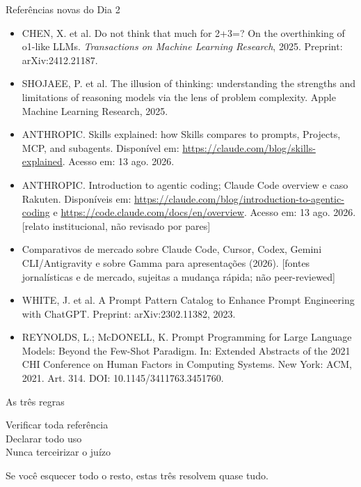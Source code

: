 \documentclass[11pt,aspectratio=169,t]{beamer}
\begin{document}
\begin{frame}{Referências novas do Dia 2}
  \tiny
  \begin{itemize}
    \item CHEN, X. et al. Do not think that much for 2+3=? On the overthinking of o1-like LLMs. \textit{Transactions on Machine Learning Research}, 2025. Preprint: arXiv:2412.21187.
    \item SHOJAEE, P. et al. The illusion of thinking: understanding the strengths and limitations of reasoning models via the lens of problem complexity. Apple Machine Learning Research, 2025.
    \item ANTHROPIC. Skills explained: how Skills compares to prompts, Projects, MCP, and subagents. Disponível em: \url{https://claude.com/blog/skills-explained}. Acesso em: 13 ago. 2026.
    \item ANTHROPIC. Introduction to agentic coding; Claude Code overview e caso Rakuten. Disponíveis em: \url{https://claude.com/blog/introduction-to-agentic-coding} e \url{https://code.claude.com/docs/en/overview}. Acesso em: 13 ago. 2026. \alert{[relato institucional, não revisado por pares]}
    \item Comparativos de mercado sobre Claude Code, Cursor, Codex, Gemini CLI/Antigravity e sobre Gamma para apresentações (2026). \alert{[fontes jornalísticas e de mercado, sujeitas a mudança rápida; não peer-reviewed]}
    \item WHITE, J. et al. A Prompt Pattern Catalog to Enhance Prompt Engineering with ChatGPT. Preprint: arXiv:2302.11382, 2023.
    \item REYNOLDS, L.; McDONELL, K. Prompt Programming for Large Language Models: Beyond the Few-Shot Paradigm. In: Extended Abstracts of the 2021 CHI Conference on Human Factors in Computing Systems. New York: ACM, 2021. Art. 314. DOI: 10.1145/3411763.3451760.
  \end{itemize}
\end{frame}

\begin{frame}{As três regras}
  \vfill
  \begin{alertblock}{}
    \centering\Large
    Verificar toda referência\\[0.3cm]
    Declarar todo uso\\[0.3cm]
    Nunca terceirizar o juízo
  \end{alertblock}
  \pause
  \vfill
  \begin{block}{}
    \centering Se você esquecer todo o resto, estas três resolvem quase tudo.
  \end{block}
\end{frame}
\end{document}
